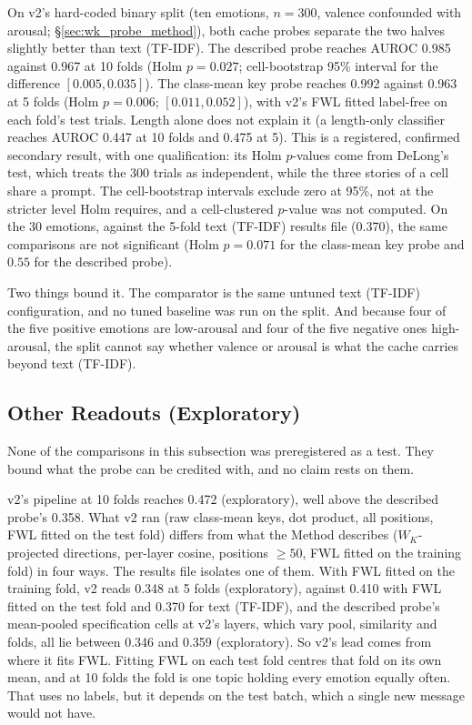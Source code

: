 On v2's hard-coded binary split (ten emotions, $n = 300$, valence confounded with arousal; \S\ref{sec:wk_probe_method}), both cache probes separate the two halves slightly better than text (TF-IDF). The described probe reaches AUROC 0.985 against 0.967 at 10 folds (Holm $p = 0.027$; cell-bootstrap 95\% interval for the difference $[0.005, 0.035]$). The class-mean key probe reaches 0.992 against 0.963 at 5 folds (Holm $p = 0.006$; $[0.011, 0.052]$), with v2's FWL fitted label-free on each fold's test trials. Length alone does not explain it (a length-only classifier reaches AUROC 0.447 at 10 folds and 0.475 at 5). This is a registered, confirmed secondary result, with one qualification: its Holm $p$-values come from DeLong's test, which treats the 300 trials as independent, while the three stories of a cell share a prompt. The cell-bootstrap intervals exclude zero at 95\%, not at the stricter level Holm requires, and a cell-clustered $p$-value was not computed. On the 30 emotions, against the 5-fold text (TF-IDF) results file (0.370), the same comparisons are not significant (Holm $p = 0.071$ for the class-mean key probe and $0.55$ for the described probe).

Two things bound it. The comparator is the same untuned text (TF-IDF) configuration, and no tuned baseline was run on the split. And because four of the five positive emotions are low-arousal and four of the five negative ones high-arousal, the split cannot say whether valence or arousal is what the cache carries beyond text (TF-IDF).

\subsection{Other Readouts (Exploratory)}
\label{sec:where}

None of the comparisons in this subsection was preregistered as a test. They bound what the probe can be credited with, and no claim rests on them.

v2's pipeline at 10 folds reaches 0.472 (exploratory), well above the described probe's 0.358. What v2 ran (raw class-mean keys, dot product, all positions, FWL fitted on the test fold) differs from what the Method describes ($W_K$-projected directions, per-layer cosine, positions $\geq 50$, FWL fitted on the training fold) in four ways. The results file isolates one of them. With FWL fitted on the training fold, v2 reads 0.348 at 5 folds (exploratory), against 0.410 with FWL fitted on the test fold and 0.370 for text (TF-IDF), and the described probe's mean-pooled specification cells at v2's layers, which vary pool, similarity and folds, all lie between 0.346 and 0.359 (exploratory). So v2's lead comes from where it fits FWL. Fitting FWL on each test fold centres that fold on its own mean, and at 10 folds the fold is one topic holding every emotion equally often. That uses no labels, but it depends on the test batch, which a single new message would not have.


